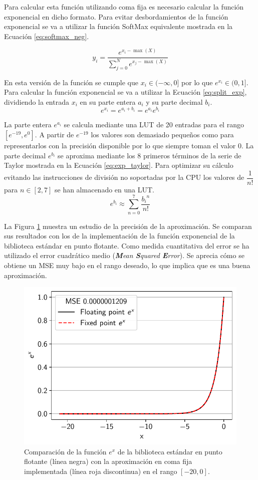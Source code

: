 Para calcular esta función utilizando coma fija es necesario calcular la función exponencial en dicho formato. Para evitar desbordamientos de la función exponencial se va a utilizar la función SoftMax equivalente mostrada en la Ecuación \ref{eq:softmax_neg}.

\begin{equation} \label{eq:softmax_neg}
y_i = \dfrac{e^{x_i - \max(X)}}{\sum_{j = 0}^N e^{x_j - \max(X)}}
\end{equation}

En esta versión de la función se cumple que $x_i \in (-\infty, 0]$ por lo que $e^{x_i} \in (0,1]$. Para calcular la función exponencial se va a utilizar la Ecuación \ref{eq:split_exp}, dividiendo la entrada $x_i$ en su parte entera $a_i$ y su parte decimal $b_i$.
\begin{equation} \label{eq:split_exp}
e^{x_i} = e^{a_i+b_i} = e^{a_i} e^{b_i}
\end{equation}

La parte entera $e^{a_i}$ se calcula mediante una LUT de 20 entradas para el rango $[e^{-19}, e^{0}]$. A partir de $e^{-19}$ los valores son demasiado pequeños como para representarlos con la precisión disponible por lo que siempre toman el valor $0$. La parte decimal $e^{b_i}$ se aproxima mediante los 8 primeros términos de la serie de Taylor mostrada en la Ecuación \ref{eq:exp_taylor}. Para optimizar su cálculo evitando las instrucciones de división no soportadas por la CPU los valores de $\dfrac{1}{n!}$ para $n \in [2,7]$ se han almacenado en una LUT.
\begin{equation} \label{eq:exp_taylor}
e^{b_i} \approx \sum_{n=0}^{7} \dfrac{{b_i}^n}{n!}
\end{equation}

La Figura \ref{fig:exp_aprox} muestra un estudio de la precisión de la aproximación. Se comparan sus resultados con los de la implementación de la función exponencial de la biblioteca estándar en punto flotante. Como medida cuantitativa del error se ha utilizado el error cuadrático medio (\textit{\textbf{M}ean \textbf{S}quared \textbf{E}rror}). Se aprecia cómo se obtiene un MSE muy bajo en el rango deseado, lo que implica que es una buena aproximación.

\begin{figure}[h]
	\centering
	\includegraphics[width=0.55\linewidth]{root/Imagenes/bnn_lib/exp_aprox.pdf}
	\caption{Comparación de la función $e^x$ de la biblioteca estándar en punto flotante (línea negra) con la aproximación en coma fija implementada (línea roja discontinua) en el rango $[-20,0]$.}
	\label{fig:exp_aprox}
\end{figure}

